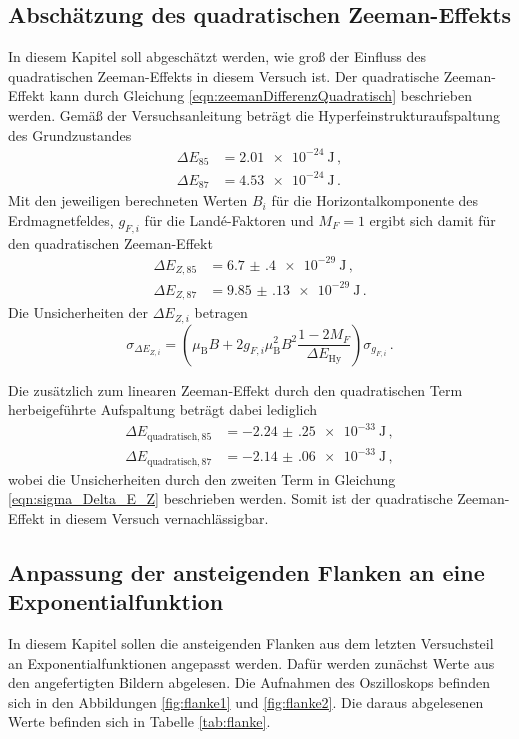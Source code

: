 \begin{equatio*}
\subsection{Abschätzung des quadratischen Zeeman-Effekts}
\label{subsec:zeeman}
In diesem Kapitel soll abgeschätzt werden, wie groß der Einfluss des quadratischen Zeeman-Effekts
in diesem Versuch ist. Der quadratische Zeeman-Effekt kann durch Gleichung
\eqref{eqn:zeemanDifferenzQuadratisch} beschrieben werden. Gemäß der Versuchsanleitung \cite{Versuchsanleitung} beträgt die
Hyperfeinstrukturaufspaltung des Grundzustandes
\begin{align*}
  \Delta E_{85}&= \SI{2.01e-24}{\joule}\,,\\
  \Delta E_{87}&= \SI{4.53e-24}{\joule}\,.
\end{align*}
Mit den jeweiligen berechneten Werten $B_i$ für die Horizontalkomponente des Erdmagnetfeldes,
$g_{F,i}$ für die Landé-Faktoren und $M_F=1$ ergibt sich damit für den quadratischen Zeeman-Effekt
\begin{align*}
  \Delta E_{Z,85}&=\SI{6.7(4)e-29}{\joule}\,,\\
  \Delta E_{Z,87}&=\SI{9.85(13)e-29}{\joule}\,.
\end{align*}
Die Unsicherheiten der $\Delta E_{Z,i}$ betragen
\begin{equation}
  \sigma_{\Delta E_{Z,i}} = \left( \mu_{\text{B}} B + 2 g_{F,i} \mu_{\text{B}}^2 B^2 \frac{1 - 2 M_F}{\Delta E_{\text{Hy}}} \right) \sigma_{g_{F,i}}\,.
  \label{eqn:sigma_Delta_E_Z}
\end{equation}

Die zusätzlich zum linearen Zeeman-Effekt durch den quadratischen Term herbeigeführte Aufspaltung beträgt dabei lediglich
\begin{align*}
  \Delta E_{\text{quadratisch},85}&=\SI{-2.24(25)e-33}{\joule}\,,\\
  \Delta E_{\text{quadratisch},87}&=\SI{-2.14(06)e-33}{\joule}\,,
\end{align*}
wobei die Unsicherheiten durch den zweiten Term in Gleichung \eqref{eqn:sigma_Delta_E_Z} beschrieben werden.
Somit ist der quadratische Zeeman-Effekt in diesem Versuch vernachlässigbar.

\subsection{Anpassung der ansteigenden Flanken an eine Exponentialfunktion}
\label{subsec:flanken}

In diesem Kapitel sollen die ansteigenden Flanken aus dem letzten Versuchsteil an
Exponentialfunktionen angepasst werden. Dafür werden zunächst Werte aus den angefertigten
Bildern abgelesen. Die Aufnahmen des Oszilloskops befinden sich in den Abbildungen
\ref{fig:flanke1} und \ref{fig:flanke2}. Die daraus abgelesenen Werte befinden sich in
Tabelle \ref{tab:flanke}.


\end{equatio*}
